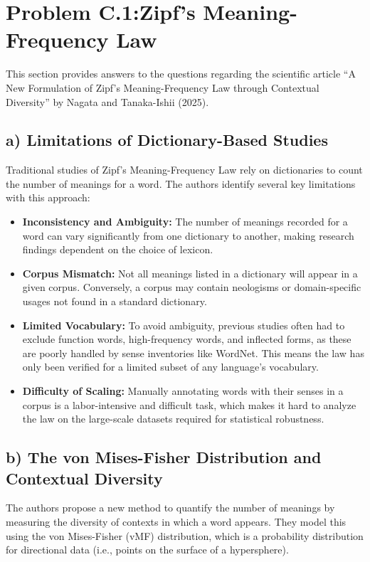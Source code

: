 \documentclass{solutionclass} %
\begin{document}
\clearpage

\section{\hspace{4pt}Problem C.1:\@ Zipf's Meaning-Frequency Law}\label{sec:problem_c1}
This section provides answers to the questions regarding the scientific article ``A New Formulation of Zipf's Meaning-Frequency Law through Contextual Diversity'' by Nagata and Tanaka-Ishii (2025).

\subsection{a) Limitations of Dictionary-Based Studies}
Traditional studies of Zipf's Meaning-Frequency Law rely on dictionaries to count the number of meanings for a word. The authors identify several key limitations with this approach:
\begin{itemize}
    \item \textbf{Inconsistency and Ambiguity:} The number of meanings recorded for a word can vary significantly from one dictionary to another, making research findings dependent on the choice of lexicon.
    \item \textbf{Corpus Mismatch:} Not all meanings listed in a dictionary will appear in a given corpus. Conversely, a corpus may contain neologisms or domain-specific usages not found in a standard dictionary.
    \item \textbf{Limited Vocabulary:} To avoid ambiguity, previous studies often had to exclude function words, high-frequency words, and inflected forms, as these are poorly handled by sense inventories like WordNet. This means the law has only been verified for a limited subset of any language's vocabulary.
    \item \textbf{Difficulty of Scaling:} Manually annotating words with their senses in a corpus is a labor-intensive and difficult task, which makes it hard to analyze the law on the large-scale datasets required for statistical robustness.
\end{itemize}

\subsection{b) The von Mises-Fisher Distribution and Contextual Diversity}
The authors propose a new method to quantify the number of meanings by measuring the diversity of contexts in which a word appears. They model this using the von Mises-Fisher (vMF) distribution, which is a probability distribution for directional data (i.e., points on the surface of a hypersphere).
\end{document}
